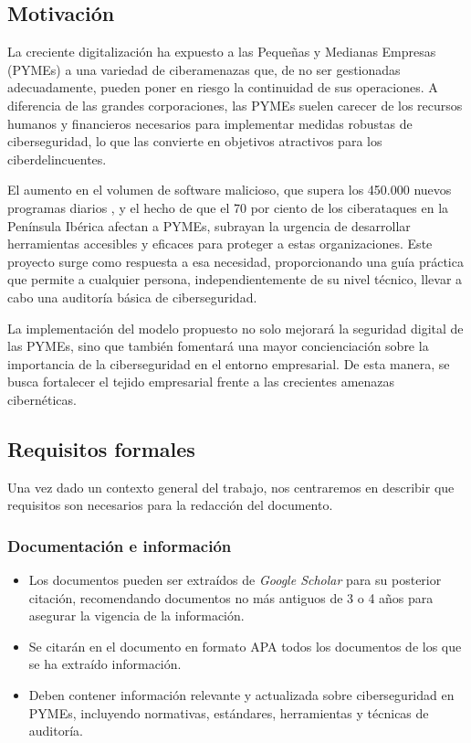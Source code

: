 \documentclass[a4paper, 10pt]{article}
\begin{document}
\subsection{Motivación}
La creciente digitalización ha expuesto a las Pequeñas y Medianas Empresas (PYMEs) a una variedad de ciberamenazas que, de no ser gestionadas adecuadamente, pueden poner en riesgo la continuidad de sus operaciones. A diferencia de las grandes corporaciones, las PYMEs suelen carecer de los recursos humanos y financieros necesarios para implementar medidas robustas de ciberseguridad, lo que las convierte en objetivos atractivos para los ciberdelincuentes.
\par\vspace{0.5cm}
El aumento en el volumen de software malicioso, que supera los 450.000 nuevos programas diarios \cite{avtest}, y el hecho de que el 70 por ciento de los ciberataques en la Península Ibérica afectan a PYMEs, subrayan la urgencia de desarrollar herramientas accesibles y eficaces para proteger a estas organizaciones. Este proyecto surge como respuesta a esa necesidad, proporcionando una guía práctica que permite a cualquier persona, independientemente de su nivel técnico, llevar a cabo una auditoría básica de ciberseguridad.
\par\vspace{0.5cm}

La implementación del modelo propuesto no solo mejorará la seguridad digital de las PYMEs, sino que también fomentará una mayor concienciación sobre la importancia de la ciberseguridad en el entorno empresarial. De esta manera, se busca fortalecer el tejido empresarial frente a las crecientes amenazas cibernéticas.


\subsection{Requisitos formales}
Una vez dado un contexto general del trabajo, nos centraremos en describir que requisitos son necesarios para la redacción
 del documento.
\subsubsection{Documentación e información}
\begin{itemize}
    \item Los documentos pueden ser extraídos de \textit{Google Scholar} para su posterior citación, recomendando documentos no más antiguos de 3 o 4 años para asegurar la vigencia de la información.
    \item Se citarán en el documento en formato APA todos los documentos de los que se ha extraído información.
    \item Deben contener información relevante y actualizada sobre ciberseguridad en PYMEs, incluyendo normativas, estándares, herramientas y técnicas de auditoría.
\end{itemize}
\end{document}

